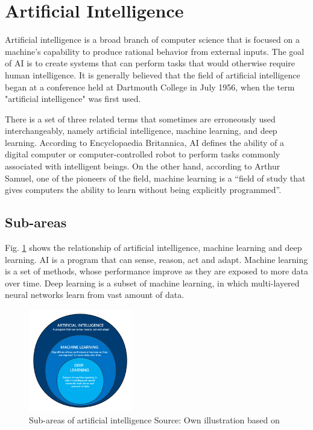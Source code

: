 \section{Artificial Intelligence}
Artificial intelligence is a broad branch of computer science that is focused on a machine’s capability to produce rational behavior from external inputs. The goal of AI is to create systems that can perform tasks that would otherwise require human intelligence. It is generally believed that the field of artificial intelligence began at a conference held at Dartmouth College in July 1956, when the term "artificial intelligence" was first used\parencite{Brunette2009}.

There is a set of three related terms that sometimes are erroneously used interchangeably, namely artificial intelligence, machine learning, and deep learning. According to Encyclopaedia Britannica, AI defines the ability of a digital computer or computer-controlled robot to perform tasks commonly associated with intelligent beings. On the other hand, according to Arthur Samuel, one of the pioneers of the field, machine learning is a “field of study that gives computers the ability to learn without being explicitly programmed”\parencite{Samuel1959, Bhavsar2017}.

\subsection{Sub-areas}
Fig. \ref{fig:ai_taxonomy} shows the relationship of artificial intelligence, machine learning and deep learning. AI is a program that can sense, reason, act and adapt. Machine learning is a set of methods, whose performance improve as they are exposed to more data over time.	Deep learning is a subset of machine learning, in which multi-layered neural networks learn from vast amount of data.

\begin{figure}[htbp]
\centering
\includegraphics[width=0.4\textwidth]{./images/ai_taxonomy.png}
\caption{Sub-areas of artificial intelligence Source: Own illustration based
on\parencite{Suman2020}}
\label{fig:ai_taxonomy}
\end{figure}

